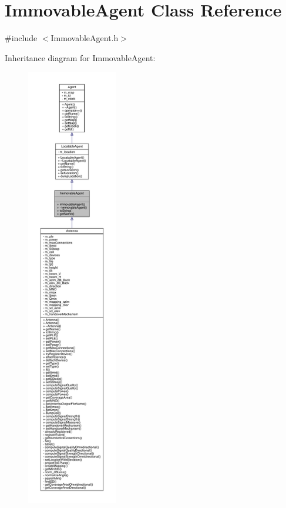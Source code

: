 \hypertarget{class_immovable_agent}{}\section{Immovable\+Agent Class Reference}
\label{class_immovable_agent}


{\ttfamily \#include $<$Immovable\+Agent.\+h$>$}



Inheritance diagram for Immovable\+Agent\+:\nopagebreak
\begin{figure}[H]
\begin{center}
\leavevmode
\includegraphics[height=550pt]{class_immovable_agent__inherit__graph}
\end{center}
\end{figure}


